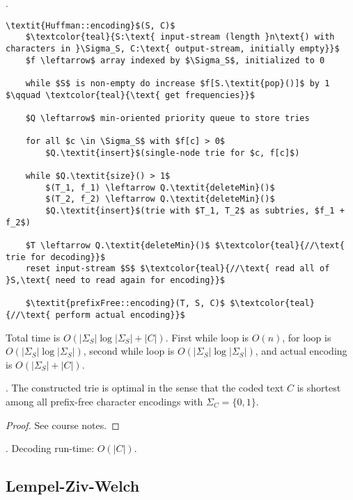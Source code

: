 \documentclass{article}
\begin{document}
\begin{codes}[].
    \begin{lstlisting}[style=cppstyle, mathescape=true]
    \textit{Huffman::encoding}$(S, C)$
    $\textcolor{teal}{S:\text{ input-stream (length }n\text{) with characters in }\Sigma_S, C:\text{ output-stream, initially empty}}$
    $f \leftarrow$ array indexed by $\Sigma_S$, initialized to 0
    
    while $S$ is non-empty do increase $f[S.\textit{pop}()]$ by 1 $\qquad \textcolor{teal}{\text{ get frequencies}}$
    
    $Q \leftarrow$ min-oriented priority queue to store tries
    
    for all $c \in \Sigma_S$ with $f[c] > 0$
        $Q.\textit{insert}$(single-node trie for $c, f[c]$)
    
    while $Q.\textit{size}() > 1$
        $(T_1, f_1) \leftarrow Q.\textit{deleteMin}()$
        $(T_2, f_2) \leftarrow Q.\textit{deleteMin}()$
        $Q.\textit{insert}$(trie with $T_1, T_2$ as subtries, $f_1 + f_2$)
    
    $T \leftarrow Q.\textit{deleteMin}()$ $\textcolor{teal}{//\text{ trie for decoding}}$
    reset input-stream $S$ $\textcolor{teal}{//\text{ read all of }S,\text{ need to read again for encoding}}$
    
    $\textit{prefixFree::encoding}(T, S, C)$ $\textcolor{teal}{//\text{ perform actual encoding}}$
    \end{lstlisting}
    Total time is $O(|\Sigma_S| \log |\Sigma_S| + |C|)$. First while loop is $O(n)$, for loop is $O(|\Sigma_S| \log |\Sigma_S|)$, second while loop is $O(|\Sigma_S| \log |\Sigma_S|)$, and actual encoding is $O(|\Sigma_S| + |C|)$.  
\end{codes}

\begin{thmm}[].
    The constructed trie is optimal in the sense that the coded text $C$ is shortest among all prefix-free character encodings with $\Sigma_C = \{0, 1\}$. 
\end{thmm} 

\begin{proof}
    See course notes. 
\end{proof}

\begin{result}[].
    Decoding run-time: $O(|C|)$.  
\end{result}

\subsection{Lempel-Ziv-Welch} 
\end{document}
